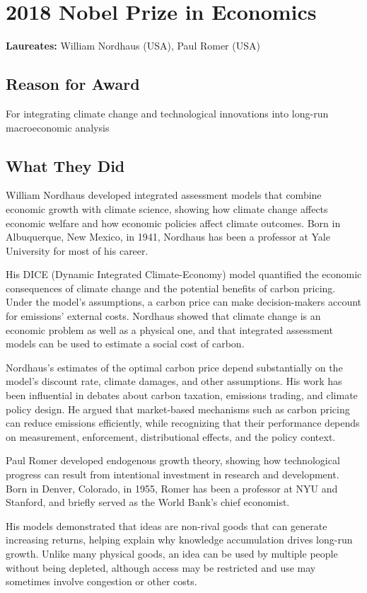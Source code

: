 \chapter{2018 Nobel Prize in Economics}
\textbf{Laureates: }William Nordhaus (USA), Paul Romer (USA)

\section*{Reason for Award}
For integrating climate change and technological innovations into long-run
macroeconomic analysis

\section{What They Did}
William Nordhaus developed integrated assessment models that combine economic
growth with climate science, showing how climate change affects economic welfare
and how economic policies affect climate outcomes. Born in Albuquerque, New Mexico,
in 1941, Nordhaus has been a professor at Yale University for most of his career.

His DICE (Dynamic Integrated Climate-Economy) model quantified the economic
consequences of climate change and the potential benefits of carbon pricing.
Under the model's assumptions, a carbon price can make decision-makers account
for emissions' external costs. Nordhaus showed that climate change is an economic
problem as well as a physical one, and that integrated assessment models can be
used to estimate a social cost of carbon.

Nordhaus's estimates of the optimal carbon price depend substantially on the
model's discount rate, climate damages, and other assumptions. His work has been influential
in debates about carbon taxation, emissions trading, and climate policy design.
He argued that market-based mechanisms such as carbon pricing can reduce
emissions efficiently, while recognizing that their performance depends on
measurement, enforcement, distributional effects, and the policy context.

Paul Romer developed endogenous growth theory, showing how technological progress
can result from intentional investment in research and development. Born in
Denver, Colorado, in 1955, Romer has been a professor at NYU
and Stanford, and briefly served as the World Bank's chief economist.

His models demonstrated that ideas are non-rival goods that can generate
increasing returns, helping explain why knowledge accumulation drives long-run
growth. Unlike many physical goods, an idea can be used by multiple people without
being depleted, although access may be restricted and use may sometimes involve
congestion or other costs.

